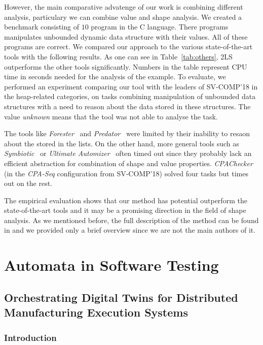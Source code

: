 {However, the main comparative advatenge of our work is combining different analysis,
particulary we can combine value and shape analysis.
We created a benchmark consisting of $10$ program in the C language.
There programs manipulates unbounded dynamic data structure with their values.
All of these programs are correct.
We compared our approach to the various state-of-the-art tools with the following results.
As one can see in Table~\ref{tab:others}, 2LS outperforms the other tools significantly.
Numbers in the table represent CPU time in seconds needed for the
analysis of the example.
%
To evaluate, we performed an experiment comparing our tool with the
leaders of SV-COMP'18 in the heap-related categories, on tasks
combining manipulation of unbounded data structures with a need to
reason about the data stored in these structures.
The value \emph{unknown} means that the tool was not able to analyse
the task.

The tools like \emph{Forester}~\cite{HHRSV11} and \emph{Predator}~\cite{DPV13} were
limited by their inability to resaon about the stored in the lists.
On the other hand, more general tools such as \emph{Symbiotic}~\cite{CVS18} or
\emph{Ultimate Automizer}~\cite{HCDGHLNM18} often timed out since they
probably lack an efficient abstraction for combination of shape and
value properties. \emph{CPAChecker}~\cite{BK11} (in the
\emph{CPA-Seq} configuration from SV-COMP'18) solved four tasks but
times out on the rest.

The empirical evaluation shows that our method has potential outperform the
state-of-the-art tools and it may be a promising direction in the field of shape
analysis.
As we mentioned before, the full description of the method can be found in \cite{fmcad18}
and we provided only a brief overview since we are not the main authors of it.

\part{Automata in Software Testing}

\chapter{Orchestrating Digital Twins for Distributed Manufacturing Execution Systems}
\label{ch:eurocast}
\section{Introduction}

}
